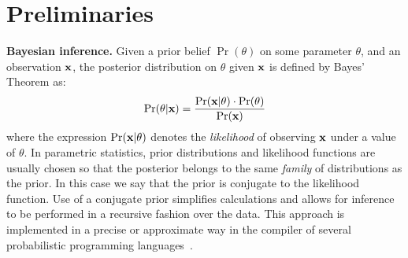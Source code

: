 \documentclass{article}
\begin{document}


\section{Preliminaries}
\label{sec_background}
\noindent \textbf{Bayesian inference.} 
Given a prior belief $\Pr(\theta)$ on some parameter $\theta$,
and an observation $\textbf{x}$, the posterior distribution on $\theta$
given $\textbf{x}$ is defined by Bayes' Theorem as:
\[
  \Pr(\theta | \textbf{x}) = \frac{\Pr(\textbf{x} | \theta) \cdot \Pr(\theta)}{\Pr(\textbf{x})}
\]
where the expression $\Pr(\textbf{x} | \theta)$ denotes the
\emph{likelihood} of observing $\textbf{x}$ under a value of
$\theta$. 
In parametric statistics, prior distributions and likelihood functions are usually chosen so that the posterior
belongs to the same \emph{family} of distributions as the prior. In this case we say that the prior
is conjugate to the likelihood function. Use of a conjugate prior
simplifies calculations and allows for inference to be performed in a
recursive fashion over the data. This approach is implemented in a
precise or approximate way in the compiler of several
probabilistic programming languages~\cite{}.
\end{document}
